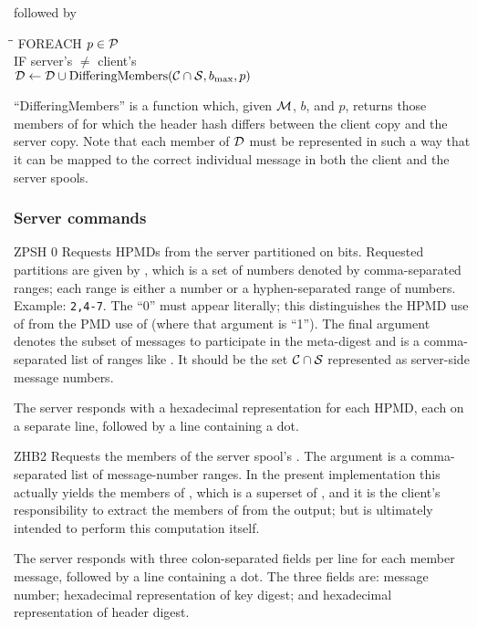 \noindent
followed by

\begin{tabbing}
\hspace*{.125in}\=\hspace*{.125in}\=\kill
FOREACH $ p \in {\cal P} $ \\
\>IF server's  $\not=$ client's  \\
\>\>${\cal D} \gets {\cal D} \cup \mbox{DifferingMembers}({\cal C}\cap{\cal S},{b_{\rm max}}{},p)$
\end{tabbing}

``DifferingMembers'' is a function which, given ${\cal M}$, $b$,
and $p$, returns those members of  for which
the header hash differs between the client copy and the server copy.
Note that each member of ${\cal D}$ must be represented in such a
way that it can be mapped to the correct individual message in both
the client and the server spools.

\subsubsection{Server commands}

\begin{codelist}
\item[ZPSH \var{b} \var{p} 0 \var{s}] Requests HPMDs from the server
partitioned on  bits.  Requested partitions are given by
, which is a set of numbers denoted by comma-separated ranges;
each range is either a number or a hyphen-separated range of numbers.
Example: {\tt 2,4-7}.  The ``0'' must appear literally; this
distinguishes the HPMD use of  from the PMD use of
 (where that argument is ``1'').  The final argument
 denotes the subset of messages to participate in the
meta-digest and is a comma-separated list of ranges like .  It
should be the set ${\cal C}\cap{\cal S}$ represented as
server-side message numbers.

The server responds with a hexadecimal representation for each HPMD,
each on a separate line, followed by a line containing a dot.

\item[ZHB2 \var{b} \var{p} \var{s}] Requests the members of the server
spool's .  The argument  is a comma-separated
list of message-number ranges.  In the present implementation this
actually yields the members of , which is a superset of
, and it is the client's responsibility to extract the
members of  from the output; but  is ultimately
intended to perform this computation itself.

The server responds with three colon-separated fields per line for
each member message, followed by a line containing a dot.  The three
fields are: message number; hexadecimal representation of key digest;
and hexadecimal representation of header digest.
\end{codelist}

